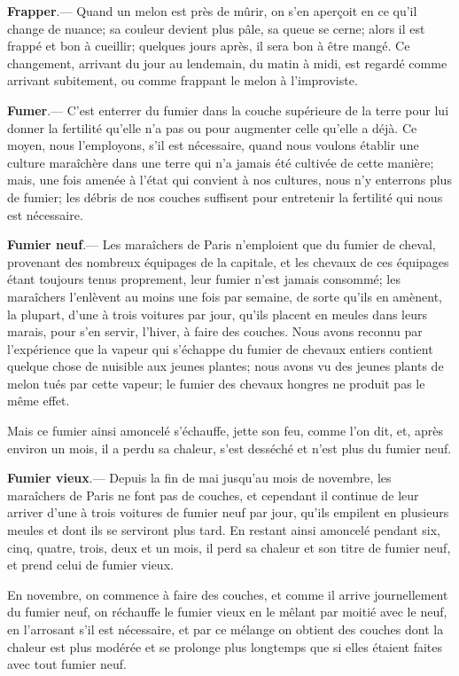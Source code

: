 \documentclass[10pt,a4paper]{book}
\begin{document}
\textbf{Frapper}.--- Quand un melon est près de mûrir, on s'en aperçoit en ce qu'il change de nuance; sa couleur devient plus pâle, sa queue se cerne; alors il est frappé et bon à cueillir; quelques jours après, il sera bon à être mangé. Ce changement, arrivant du jour au lendemain, du matin à midi, est regardé comme arrivant subitement, ou comme frappant le melon à l'improviste.

\textbf{Fumer}.--- C'est enterrer du fumier dans la couche supérieure de la terre pour lui donner la fertilité qu'elle n'a pas ou pour augmenter celle qu'elle a déjà. Ce moyen, nous l'employons, s'il est nécessaire, quand nous voulons établir une culture maraîchère dans une terre qui n'a jamais été cultivée de cette manière; mais, une fois amenée à l'état qui convient à nos cultures, nous n'y enterrons plus de fumier; les débris de nos couches suffisent pour entretenir la fertilité qui nous est nécessaire.

\textbf{Fumier neuf}.--- Les maraîchers de Paris n'emploient que du fumier de cheval, provenant des nombreux équipages de la capitale, et les chevaux de ces équipages étant toujours tenus proprement, leur fumier n'est jamais consommé; les maraîchers l'enlèvent au moins une fois par semaine, de sorte qu'ils en amènent, la plupart, d'une à trois voitures par jour, qu'ils placent en meules dans leurs marais, pour s'en servir, l'hiver, à faire des couches. Nous avons reconnu par l'expérience que la vapeur qui s'échappe du fumier de chevaux entiers contient quelque chose de nuisible aux jeunes plantes; nous avons vu des jeunes plants de melon tués par cette vapeur; le fumier des chevaux hongres ne produit pas le même effet.

Mais ce fumier ainsi amoncelé s'échauffe, jette son feu, comme l'on dit, et, après environ un mois, il a perdu sa chaleur, s'est desséché et n'est plus du fumier neuf.

\textbf{Fumier vieux}.--- Depuis la fin de mai jusqu'au mois de novembre, les maraîchers de Paris ne font pas de couches, et cependant il continue de leur arriver d'une à trois voitures de fumier neuf par jour, qu'ils empilent en plusieurs meules et dont ils se serviront plus tard. En restant ainsi amoncelé pendant six, cinq, quatre, trois, deux et un mois, il perd sa chaleur et son titre de fumier neuf, et prend celui de fumier vieux.

En novembre, on commence à faire des couches, et comme il arrive journellement du fumier neuf, on réchauffe le fumier vieux en le mêlant par moitié avec le neuf, en l'arrosant s'il est nécessaire, et par ce mélange on obtient des couches dont la chaleur est plus modérée et se prolonge plus longtemps que si elles étaient faites avec tout fumier neuf.
\end{document}
